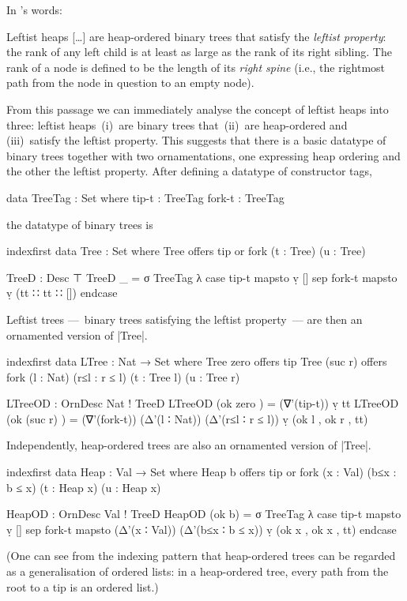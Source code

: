 In \citeauthor{Okasaki-data-structures}'s words:
\begin{quoting}\relax
Leftist heaps [\ldots$\!$] are heap-ordered binary trees that satisfy the \emph{leftist property}: the rank of any left child is at least as large as the rank of its right sibling. The rank of a node is defined to be the length of its \emph{right spine} (i.e., the rightmost path from the node in question to an empty node).
\end{quoting}
From this passage we can immediately analyse the concept of leftist heaps into three: leftist heaps \,(i)~are binary trees that \,(ii)~are heap-ordered and \,(iii)~satisfy the leftist property.
This suggests that there is a basic datatype of binary trees together with two ornamentations, one expressing heap ordering and the other the leftist property.
After defining a datatype of constructor tags,
\begin{code}
data TreeTag : Set where
  tip-t   :  TreeTag
  fork-t  :  TreeTag
\end{code}
the datatype of binary trees is
\begin{code}
indexfirst data Tree : Set where
  Tree  offers  tip
        or      fork (t : Tree) (u : Tree)

TreeD : Desc ⊤
TreeD  _ = σ TreeTag λ  case  tip-t   mapsto  ṿ []
                        sep   fork-t  mapsto  ṿ (tt ∷ tt ∷ []) endcase
\end{code}
Leftist trees ---~binary trees satisfying the leftist property~--- are then an ornamented version of |Tree|.
\begin{code}
indexfirst data LTree : Nat → Set where
  Tree zero     offers  tip
  Tree (suc r)  offers  fork (l : Nat) (r≤l : r ≤ l) (t : Tree l) (u : Tree r)

LTreeOD : OrnDesc Nat ! TreeD
LTreeOD (ok zero     )   =  (∇'(tip-t)) ṿ tt
LTreeOD (ok (suc r)  )   =  (∇'(fork-t)) (Δ'(l ∶ Nat)) (Δ'(r≤l ∶ r ≤ l)) ṿ (ok l , ok r , tt)
\end{code}
Independently, heap-ordered trees are also an ornamented version of |Tree|.
\begin{code}
indexfirst data Heap : Val → Set where
  Heap b  offers  tip
          or      fork (x : Val) (b≤x : b ≤ x) (t : Heap x) (u : Heap x)

HeapOD : OrnDesc Val ! TreeD
HeapOD (ok b) =
  σ TreeTag  λ  case  tip-t   mapsto  ṿ []
                sep   fork-t  mapsto  (Δ'(x ∶ Val)) (Δ'(b≤x ∶ b ≤ x)) ṿ (ok x , ok x , tt) endcase
\end{code}
(One can see from the indexing pattern that heap-ordered trees can be regarded as a generalisation of ordered lists: in a heap-ordered tree, every path from the root to a tip is an ordered list.)
